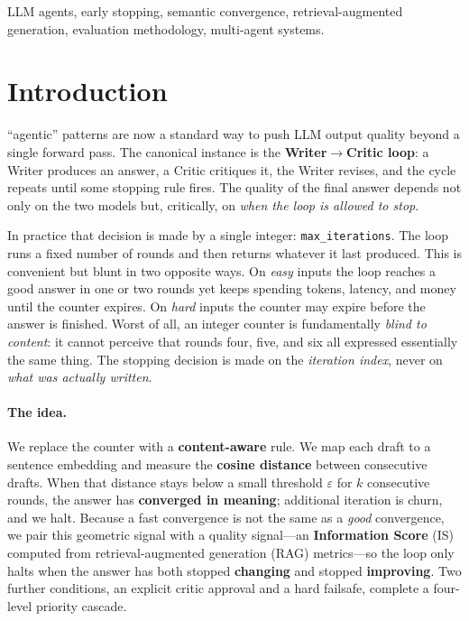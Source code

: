 \documentclass[conference]{IEEEtran}
\begin{document}
\begin{IEEEkeywords}
LLM agents, early stopping, semantic convergence, retrieval-augmented generation,
evaluation methodology, multi-agent systems.
\end{IEEEkeywords}

\section{Introduction}
 ``agentic'' patterns are now a standard way to push
LLM output quality beyond a single forward pass. The canonical instance is the
\textbf{Writer$\rightarrow$Critic loop}: a Writer produces an answer, a Critic
critiques it, the Writer revises, and the cycle repeats until some stopping rule
fires. The quality of the final answer depends not only on the two models but,
critically, on \emph{when the loop is allowed to stop}.

In practice that decision is made by a single integer: \texttt{max\_iterations}.
The loop runs a fixed number of rounds and then returns whatever it last produced.
This is convenient but blunt in two opposite ways. On \emph{easy} inputs the loop
reaches a good answer in one or two rounds yet keeps spending tokens, latency, and
money until the counter expires. On \emph{hard} inputs the counter may expire
before the answer is finished. Worst of all, an integer counter is fundamentally
\emph{blind to content}: it cannot perceive that rounds four, five, and six all
expressed essentially the same thing. The stopping decision is made on the
\emph{iteration index}, never on \emph{what was actually written}.

\paragraph{The idea.} We replace the counter with a \textbf{content-aware} rule. We
map each draft to a sentence embedding and measure the \textbf{cosine distance}
between consecutive drafts. When that distance stays below a small threshold
$\varepsilon$ for $k$ consecutive rounds, the answer has \textbf{converged in
meaning}; additional iteration is churn, and we halt. Because a fast convergence is
not the same as a \emph{good} convergence, we pair this geometric signal with a
quality signal---an \textbf{Information Score} (IS) computed from
retrieval-augmented generation (RAG) metrics---so the loop only halts when the
answer has both stopped \textbf{changing} and stopped \textbf{improving}. Two further conditions, an explicit critic approval
and a hard failsafe, complete a four-level priority cascade.
\end{document}

